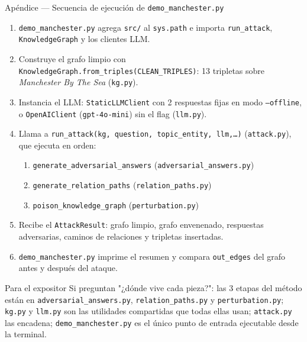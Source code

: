 \documentclass[aspectratio=169]{beamer}
\begin{document}
\begin{frame}[fragile]{Apéndice --- Secuencia de ejecución de \texttt{demo\_manchester.py}}
  \scriptsize
  \begin{enumerate}
    \item \texttt{demo\_manchester.py} agrega \texttt{src/} al
      \texttt{sys.path} e importa \texttt{run\_attack},
      \texttt{KnowledgeGraph} y los clientes LLM.
    \item Construye el grafo limpio con
      \texttt{KnowledgeGraph.from\_triples(CLEAN\_TRIPLES)}: 13 tripletas
      sobre \emph{Manchester By The Sea} \hspace{1pt}(\texttt{kg.py}).
    \item Instancia el LLM: \texttt{StaticLLMClient} con 2 respuestas fijas
      en modo \texttt{--offline}, o \texttt{OpenAIClient}
      (\texttt{gpt-4o-mini}) sin el flag \hspace{1pt}(\texttt{llm.py}).
    \item Llama a \texttt{run\_attack(kg, question, topic\_entity, llm,\dots)}
      \hspace{1pt}(\texttt{attack.py}), que ejecuta en orden:
      \begin{enumerate}
        \item \texttt{generate\_adversarial\_answers}
          \hspace{1pt}(\texttt{adversarial\_answers.py})
        \item \texttt{generate\_relation\_paths}
          \hspace{1pt}(\texttt{relation\_paths.py})
        \item \texttt{poison\_knowledge\_graph}
          \hspace{1pt}(\texttt{perturbation.py})
      \end{enumerate}
    \item Recibe el \texttt{AttackResult}: grafo limpio, grafo envenenado,
      respuestas adversarias, caminos de relaciones y tripletas insertadas.
    \item \texttt{demo\_manchester.py} imprime el resumen y compara
      \texttt{out\_edges} del grafo antes y después del ataque.
  \end{enumerate}
  \vspace{0.5em}
  \begin{alertblock}{Para el expositor}
    Si preguntan "¿dónde vive cada pieza?": las 3 etapas del método están en
    \texttt{adversarial\_answers.py}, \texttt{relation\_paths.py} y
    \texttt{perturbation.py}; \texttt{kg.py} y \texttt{llm.py} son las
    utilidades compartidas que todas ellas usan; \texttt{attack.py} las
    encadena; \texttt{demo\_manchester.py} es el único punto de entrada
    ejecutable desde la terminal.
  \end{alertblock}
\end{frame}
\end{document}
